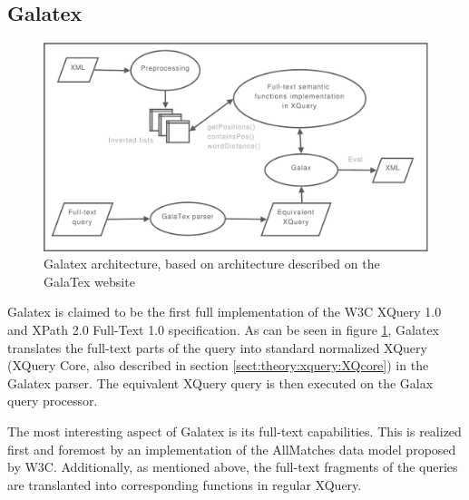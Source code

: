\subsection{Galatex}
\begin{figure}[h]
  \centering
    \includegraphics[width=1\textwidth]{diagrams/galatex_arch}
  \caption[GalaTex architecture]{Galatex architecture, based on architecture described on
  the GalaTex website\cite{galatex}}
  \label{figure:galatex:arch}
\end{figure}
Galatex is claimed to be the first full implementation of the W3C XQuery 1.0 
and XPath 2.0 Full-Text 1.0 specification\cite{w3c01}. As can be seen in figure
\ref{figure:galatex:arch}, Galatex translates the full-text parts of the query
into standard normalized XQuery (XQuery Core\cite{xquery_semantics}, also
described in section \ref{sect:theory:xquery:XQcore}) in the Galatex parser. The equivalent
XQuery query is then executed on the Galax query processor.

The most interesting aspect of Galatex is its full-text capabilities. This is
realized first and foremost by an implementation of the AllMatches data model
proposed by W3C\cite{w3c01}. Additionally, as mentioned above, the full-text fragments of the queries are
translanted into corresponding functions in regular XQuery. 

